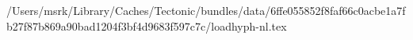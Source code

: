 /Users/msrk/Library/Caches/Tectonic/bundles/data/6ffe055852f8faf66c0acbe1a7fb27f87b869a90bad1204f3bf4d9683f597c7c/loadhyph-nl.tex